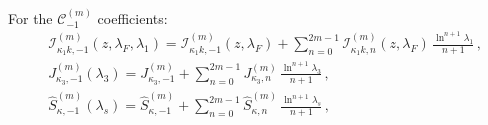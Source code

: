 For the $\mathcal{C}_{-1}^{(m)}$ coefficients:
\begin{subequations}
\begin{align}
    &\mathcal{I}_{\kappa_1 k,-1}^{(m)}(z,\lambda_F,\lambda_1) =
    \mathcal{I}_{\kappa_1 k,-1}^{(m)}(z,\lambda_F)
    + \sum_{n=0}^{2m-1}\mathcal{I}_{\kappa_1 k,n}^{(m)}(z,\lambda_F)\,
    \frac{\ln^{n+1}\!\lambda_1}{n+1}\,,\\
    &J_{\kappa_3,-1}^{(m)}(\lambda_3) =J_{\kappa_3,-1}^{(m)}+\sum_{n=0}^{2m-1}J_{\kappa_3,n}^{(m)}\,\frac{\ln^{n+1}\!\lambda_3}{n+1}\,, \\
   & \widehat{S}_{\kappa,-1}^{(m)}(\lambda_s) =
    \widehat{S}_{\kappa,-1}^{(m)}+\sum_{n=0}^{2m-1}\widehat{S}_{\kappa,n}^{(m)}\,
    \frac{\ln^{n+1}\!\lambda_s}{n+1}\,,
\end{align}
\end{subequations}


